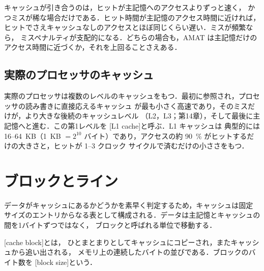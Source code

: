 \documentclass[../main.tex]{subfiles}
\begin{document}
\begin{note}
  キャッシュが引き合うのは，ヒットが主記憶へのアクセスよりずっと速く，
  かつミスが稀な場合だけである．ヒット時間が主記憶のアクセス時間に近ければ，
  ヒットでさえキャッシュなしのアクセスとほぼ同じくらい遅い．ミスが頻繁なら，
  ミスペナルティが支配的になる．どちらの場合も，AMAT は主記憶だけの
  アクセス時間に近づくか，それを上回ることさえある．
\end{note}

\subsection{実際のプロセッサのキャッシュ}

実際のプロセッサは複数のレベルのキャッシュをもつ．最初に参照され，プロセッサの読み書きに直接応えるキャッシュ
が最も小さく高速であり，そのミスだけが，より大きな後続のキャッシュレベル
（L2，L3；第14章），そして最後に主記憶へと進む．この第1レベルを
[L1 cache]と呼ぶ．L1 キャッシュは
典型的には 16--64~KB（1~KB $= 2^{10}$ バイト）であり，アクセスの約
\SI{90}{\percent} がヒットするだけの大きさと，ヒットが 1--3 クロック
サイクルで済むだけの小ささをもつ．

\section{ブロックとライン}
\label{sec:l12-blocks}

データがキャッシュにあるかどうかを素早く判定するため，キャッシュは固定
サイズのエントリからなる表として構成される．データは主記憶とキャッシュの間を1バイトずつではなく，
ブロックと呼ばれる単位で移動する．

\begin{definition}[キャッシュブロック]
  [cache block]とは，
  ひとまとまりとしてキャッシュにコピーされ，またキャッシュから追い出される，
  メモリ上の連続したバイトの並びである．ブロックのバイト数を
  [block size]という．
\end{definition}
\end{document}
